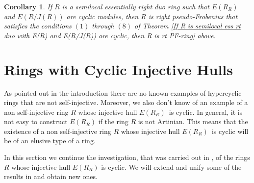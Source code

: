 \documentclass{amsart}
\theoremstyle{plain}
\newtheorem{corollary}[theorem]{Corollary}
\numberwithin{equation}{section}
\begin{document}
\begin{corollary}
If $R$ is a semilocal essentially right duo ring such that $E (R_{R})$ and $E (R/J (R))$ are cyclic modules, then $R$ is right pseudo-Frobenius that satisfies the conditions $(1)$ through $(8)$ of Theorem \ref{If R is semilocal ess rt duo with E(R) and E(R/J(R)) are cyclic, then R is rt PF-ring} above. 
\end{corollary}

\section{Rings with Cyclic Injective Hulls}
As pointed out in the introduction there are no known examples of hypercyclic rings that are not self-injective. Moreover, we also don't know
of an example of a non self-injective ring $R$ whose injective hull $E (R_{R})$\ is cyclic. In general, it is not easy to construct $E (R_{R})$ if the ring $R$ is not Artinian. This means that the existence of a non self-injective ring $R$ whose injective hull $E (R_{R})$\ is cyclic will be of an elusive type of a ring. 

In this section we
continue the investigation, that was carried out in \cite{IY 5}, of the
rings $R$ whose injective hull $E (R_{R})$ is cyclic. We will extend and unify some of the results in \cite{IY 5}
and obtain new ones. 
\end{document}
